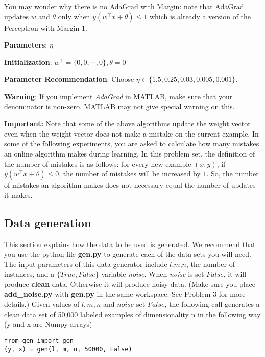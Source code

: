 \begin{enumerate}
You may wonder why there is no AdaGrad with Margin: note that AdaGrad
updates $w$ and $\theta$ only when $y(w^\intercal x+\theta) \le 1$ which is
already a version of the Perceptron with Margin 1.

  {\bf Parameters}: $\eta$

  {\bf Initialization}: $w^\intercal=\{0,0,\cdots,0\},\theta=0$

  {\bf Parameter Recommendation}: Choose $\eta \in \{1.5,0.25,0.03,0.005,0.001\}$.

  {\bf Warning}: If you implement \emph{AdaGrad} in MATLAB, make sure
that your denominator is non-zero. MATLAB may not give special warning
on this.

\end{enumerate}

{\bf Important:} Note that some of the above algorithms
update the weight vector even when the weight vector does not make a
mistake on the current example.  In some of the following experiments,
you are asked to calculate how many mistakes an online algorithm makes
during learning.  In this problem set, the definition of the number of
mistakes is as follows: for every new example $(x,y)$, if
$y(w^\intercal x + \theta) \leq 0$, the number of mistakes will be
increased by $1$. So, the number of mistakes an algorithm makes does
not necessary equal the number of updates it makes.

\subsection*{Data generation}
This section explains how the data to be used is generated. We
recommend that you use the python file {\bf gen.py} to generate each of
the data sets you will need. The input parameters of this data
generator include $l$,$m$,$n$, the number of instances, and a $\{True,
False\}$ variable \emph{noise}. When \emph{noise} is set $False$, it will
produce {\bf clean} data. Otherwise it will produce noisy data. (Make
sure you place {\bf add\_noise.py} with {\bf gen.py} in the same
workspace. See Problem 3 for more details.) Given values of $l, m, n$
and $noise$ set $False$, the following call generates a clean data set of
50,000 labeled examples of dimensionality n in the following way (y and x are Numpy arrays)

\begin{verbatim}
from gen import gen                                                                                                                                
(y, x) = gen(l, m, n, 50000, False) 
\end{verbatim}

